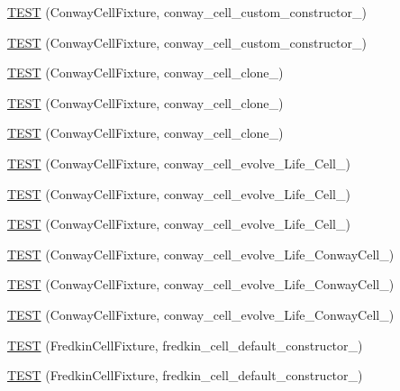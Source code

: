 \begin{DoxyCompactItemize}
\item 
\hyperlink{TestLife_8c_09_09_aee413901b77be61d37a3813e21b33652}{T\-E\-S\-T} (Conway\-Cell\-Fixture, conway\-\_\-cell\-\_\-custom\-\_\-constructor\-\_)
\item 
\hyperlink{TestLife_8c_09_09_ae601dfbb1857b791778af72bd0cc8fce}{T\-E\-S\-T} (Conway\-Cell\-Fixture, conway\-\_\-cell\-\_\-custom\-\_\-constructor\-\_)
\item 
\hyperlink{TestLife_8c_09_09_a68d33f17a57c52636d86f501a47eac1f}{T\-E\-S\-T} (Conway\-Cell\-Fixture, conway\-\_\-cell\-\_\-clone\-\_)
\item 
\hyperlink{TestLife_8c_09_09_adcef80dd8b5f5c0ed50db26cdde5b0b6}{T\-E\-S\-T} (Conway\-Cell\-Fixture, conway\-\_\-cell\-\_\-clone\-\_)
\item 
\hyperlink{TestLife_8c_09_09_ae730fcdb1bfe00fa4037eb4133c5ba27}{T\-E\-S\-T} (Conway\-Cell\-Fixture, conway\-\_\-cell\-\_\-clone\-\_)
\item 
\hyperlink{TestLife_8c_09_09_a363ded67c8747ad8eb10046c6a32a840}{T\-E\-S\-T} (Conway\-Cell\-Fixture, conway\-\_\-cell\-\_\-evolve\-\_\-\-Life\-\_\-\-Cell\-\_)
\item 
\hyperlink{TestLife_8c_09_09_a5be40abdf979ee9a370f6b3d1e981c19}{T\-E\-S\-T} (Conway\-Cell\-Fixture, conway\-\_\-cell\-\_\-evolve\-\_\-\-Life\-\_\-\-Cell\-\_)
\item 
\hyperlink{TestLife_8c_09_09_a1892a8639271cab9c6bcd42eed5ca03b}{T\-E\-S\-T} (Conway\-Cell\-Fixture, conway\-\_\-cell\-\_\-evolve\-\_\-\-Life\-\_\-\-Cell\-\_)
\item 
\hyperlink{TestLife_8c_09_09_ac4044984ea6b086b65015c3df19a8595}{T\-E\-S\-T} (Conway\-Cell\-Fixture, conway\-\_\-cell\-\_\-evolve\-\_\-\-Life\-\_\-\-Conway\-Cell\-\_)
\item 
\hyperlink{TestLife_8c_09_09_ac828a2ec42cb6f0c4b4e9088ce611509}{T\-E\-S\-T} (Conway\-Cell\-Fixture, conway\-\_\-cell\-\_\-evolve\-\_\-\-Life\-\_\-\-Conway\-Cell\-\_)
\item 
\hyperlink{TestLife_8c_09_09_a5029723212553c88dfdb43a265d01e30}{T\-E\-S\-T} (Conway\-Cell\-Fixture, conway\-\_\-cell\-\_\-evolve\-\_\-\-Life\-\_\-\-Conway\-Cell\-\_)
\item 
\hyperlink{TestLife_8c_09_09_a11561a58720be29ef22cb6250d8ea5b8}{T\-E\-S\-T} (Fredkin\-Cell\-Fixture, fredkin\-\_\-cell\-\_\-default\-\_\-constructor\-\_)
\item 
\hyperlink{TestLife_8c_09_09_ac07dedf2c2fc954a89a68b35dcb82255}{T\-E\-S\-T} (Fredkin\-Cell\-Fixture, fredkin\-\_\-cell\-\_\-default\-\_\-constructor\-\_)

\end{DoxyCompactItemize}
